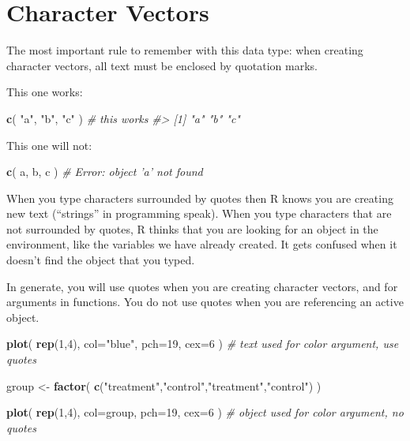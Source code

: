 \documentclass[]{book}
\newenvironment{Shaded}{\begin{snugshade}}{\end{snugshade}}
\newcommand{\CommentTok}[1]{\textcolor[rgb]{0.56,0.35,0.01}{\textit{#1}}}
\newcommand{\DataTypeTok}[1]{\textcolor[rgb]{0.13,0.29,0.53}{#1}}
\newcommand{\DecValTok}[1]{\textcolor[rgb]{0.00,0.00,0.81}{#1}}
\newcommand{\KeywordTok}[1]{\textcolor[rgb]{0.13,0.29,0.53}{\textbf{#1}}}
\newcommand{\NormalTok}[1]{#1}
\newcommand{\StringTok}[1]{\textcolor[rgb]{0.31,0.60,0.02}{#1}}
\theoremstyle{definition}
\theoremstyle{definition}
\theoremstyle{definition}
\theoremstyle{remark}
\begin{document}
\hypertarget{character-vectors}{%
\section{Character Vectors}\label{character-vectors}}

The most important rule to remember with this data type: when creating
character vectors, all text must be enclosed by quotation marks.

This one works:

\begin{Shaded}
\begin{Highlighting}[]

\KeywordTok{c}\NormalTok{( }\StringTok{"a"}\NormalTok{, }\StringTok{"b"}\NormalTok{, }\StringTok{"c"}\NormalTok{ )   }\CommentTok{# this works}
\CommentTok{#> [1] "a" "b" "c"}
\end{Highlighting}
\end{Shaded}

This one will not:

\begin{Shaded}
\begin{Highlighting}[]
\KeywordTok{c}\NormalTok{( a, b, c )  }
\CommentTok{# Error: object 'a' not found}
\end{Highlighting}
\end{Shaded}

When you type characters surrounded by quotes then R knows you are
creating new text (``strings'' in programming speak). When you type
characters that are not surrounded by quotes, R thinks that you are
looking for an object in the environment, like the variables we have
already created. It gets confused when it doesn't find the object that
you typed.

In generate, you will use quotes when you are creating character
vectors, and for arguments in functions. You do not use quotes when you
are referencing an active object.

\begin{Shaded}
\begin{Highlighting}[]


\KeywordTok{plot}\NormalTok{( }\KeywordTok{rep}\NormalTok{(}\DecValTok{1}\NormalTok{,}\DecValTok{4}\NormalTok{), }\DataTypeTok{col=}\StringTok{"blue"}\NormalTok{, }\DataTypeTok{pch=}\DecValTok{19}\NormalTok{, }\DataTypeTok{cex=}\DecValTok{6}\NormalTok{ )   }\CommentTok{# text used for color argument, use quotes}



\NormalTok{group <-}\StringTok{ }\KeywordTok{factor}\NormalTok{( }\KeywordTok{c}\NormalTok{(}\StringTok{"treatment"}\NormalTok{,}\StringTok{"control"}\NormalTok{,}\StringTok{"treatment"}\NormalTok{,}\StringTok{"control"}\NormalTok{) )}

\KeywordTok{plot}\NormalTok{( }\KeywordTok{rep}\NormalTok{(}\DecValTok{1}\NormalTok{,}\DecValTok{4}\NormalTok{), }\DataTypeTok{col=}\NormalTok{group, }\DataTypeTok{pch=}\DecValTok{19}\NormalTok{, }\DataTypeTok{cex=}\DecValTok{6}\NormalTok{ )       }\CommentTok{# object used for color argument, no quotes}
\end{Highlighting}
\end{Shaded}
\end{document}
